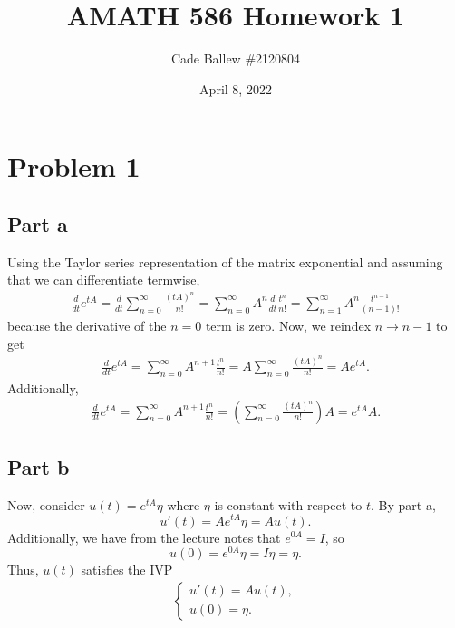 \documentclass{article}
\title{AMATH 586 Homework 1}
\author{Cade Ballew \#2120804}
\date{April 8, 2022}
\begin{document}
	
\maketitle
	
\section{Problem 1}
\subsection{Part a}
Using the Taylor series representation of the matrix exponential and assuming that we can differentiate termwise, %
\begin{align*}
\frac{d}{dt}e^{tA}=\frac{d}{dt}\sum_{n=0}^\infty\frac{(tA)^n}{n!}=\sum_{n=0}^\infty A^n\frac{d}{dt}\frac{t^n}{n!}=\sum_{n=1}^{\infty}A^n\frac{t^{n-1}}{(n-1)!}
\end{align*}
because the derivative of the $n=0$ term is zero. Now, we reindex $n\to n-1$ to get 
\begin{align*}
\frac{d}{dt}e^{tA}=\sum_{n=0}^{\infty}A^{n+1}\frac{t^{n}}{n!}=A\sum_{n=0}^\infty\frac{(tA)^n}{n!}=Ae^{tA}.
\end{align*}
Additionally,
\begin{align*}
\frac{d}{dt}e^{tA}=\sum_{n=0}^{\infty}A^{n+1}\frac{t^{n}}{n!}=\left(\sum_{n=0}^\infty\frac{(tA)^n}{n!}\right)A=e^{tA}A.
\end{align*}

\subsection{Part b}
Now, consider $u(t) = e^{t A} \eta$ where $\eta$ is constant with respect to $t$. By part a,
\[
u'(t)=Ae^{t A} \eta=Au(t).
\]
Additionally, we have from the lecture notes that $e^{0A}=I$, so
\[
u(0)=e^{0A}\eta=I\eta=\eta.
\]
Thus, $u(t)$ satisfies the IVP
  \begin{align*}
	\begin{cases}
		u'(t) = A u(t),\\
		u(0) = \eta.
	\end{cases}
\end{align*}
\end{document}
